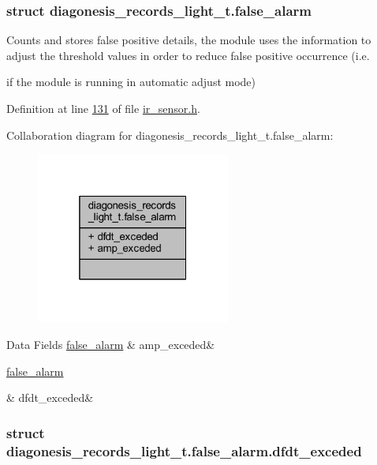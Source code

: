 \subsubsection{struct diagonesis\+\_\+records\+\_\+light\+\_\+t.\+false\+\_\+alarm}
Counts and stores false positive details, the module uses the information to adjust the threshold values in order to reduce false positive occurrence (i.\+e. 

if the module is running in automatic adjust mode) 

Definition at line \hyperlink{a00017_source_l00131}{131} of file \hyperlink{a00017_source}{ir\+\_\+sensor.\+h}.



Collaboration diagram for diagonesis\+\_\+records\+\_\+light\+\_\+t.\+false\+\_\+alarm\+:\nopagebreak
\begin{figure}[H]
\begin{center}
\leavevmode
\includegraphics[width=181pt]{dd/d38/a00928}
\end{center}
\end{figure}
\begin{DoxyFields}{Data Fields}
\hypertarget{a00017_a354a257167178900099e74081c572fda}{\hyperlink{a00017_d4/d13/a00377}{false\+\_\+alarm}}\label{a00017_a354a257167178900099e74081c572fda}
&
amp\+\_\+exceded&
\\
\hline

\hypertarget{a00017_a5dbdfe8398b5364ba1cbc50aa1323b8f}{\hyperlink{a00017_d7/d08/a00378}{false\+\_\+alarm}}\label{a00017_a5dbdfe8398b5364ba1cbc50aa1323b8f}
&
dfdt\+\_\+exceded&
\\
\hline

\end{DoxyFields}
\label{d7/d08/a00378}
\hypertarget{a00017_d7/d08/a00378}{}
\subsubsection{struct diagonesis\+\_\+records\+\_\+light\+\_\+t.\+false\+\_\+alarm.\+dfdt\+\_\+exceded}



